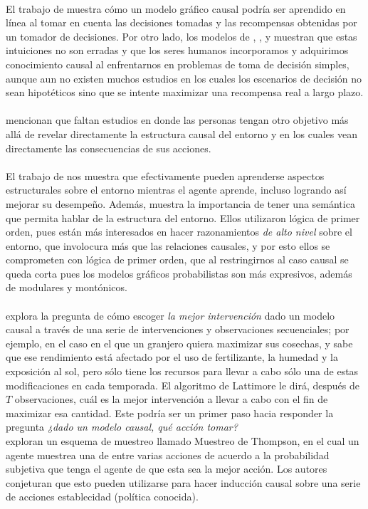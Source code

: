 \documentclass[11pt]{article}
\theoremstyle{plain}
\begin{document}
\\
El trabajo de \cite{wellen2012learning} muestra cómo un modelo gráfico causal podría ser aprendido en línea al tomar en cuenta las decisiones tomadas y las recompensas obtenidas por un tomador de decisiones. Por otro lado, los modelos de \cite{sloman2006causal}, \cite{meder2008inferring}, \cite{hagmayer2009decision} y \cite{hagmayer2013repeated} muestran que estas intuiciones no son erradas y que los seres humanos incorporamos y adquirimos conocimiento causal al enfrentarnos en problemas de toma de decisión simples, aunque aun no existen muchos estudios en los cuales los escenarios de decisión no sean hipotéticos sino que se intente maximizar una recompensa real a largo plazo. \\
\\
\cite{hagmayer2013repeated} mencionan que faltan estudios en donde las personas tengan otro objetivo más allá de revelar directamente la estructura causal del entorno y en los cuales vean directamente las consecuencias de sus acciones. \\
\\
El trabajo de \cite{garnelo2016towards} nos muestra que efectivamente pueden aprenderse aspectos estructurales sobre el entorno mientras el agente aprende, incluso logrando así mejorar su desempeño. Además, muestra la importancia de tener una semántica que permita hablar de la estructura del entorno. Ellos utilizaron lógica de primer orden, pues están más interesados en hacer razonamientos \textit{de alto nivel} sobre el entorno, que involocura más que las relaciones causales, y por esto ellos se comprometen con lógica de primer orden, que al restringirnos al caso causal se queda corta pues los modelos gráficos probabilistas son más expresivos, además de modulares y montónicos.\\
\\
\cite{lattimoreNIPS2016} explora la pregunta de cómo escoger \textit{la mejor intervención} dado un modelo causal a través de una serie de intervenciones y observaciones secuenciales; por ejemplo, en el caso en el que un granjero quiera maximizar sus cosechas, y sabe que ese rendimiento está afectado por el uso de fertilizante, la humedad y la exposición al sol, pero sólo tiene los recursos para llevar a cabo sólo una de estas modificaciones en cada temporada. El algoritmo de Lattimore le dirá, después de $T$ observaciones, cuál es la mejor intervención a llevar a cabo con el fin de maximizar esa cantidad. Este podría ser un primer paso hacia responder la pregunta \textit{¿dado un modelo causal, qué acción tomar?}
\\
\cite{ortega2014generalized} exploran un esquema de muestreo llamado Muestreo de Thompson, en el cual un agente muestrea una de entre varias acciones de acuerdo a la probabilidad subjetiva que tenga el agente de que esta sea la mejor acción. Los autores conjeturan que esto pueden utilizarse para hacer inducción causal sobre una serie de acciones establecidad (política conocida).
\end{document}
